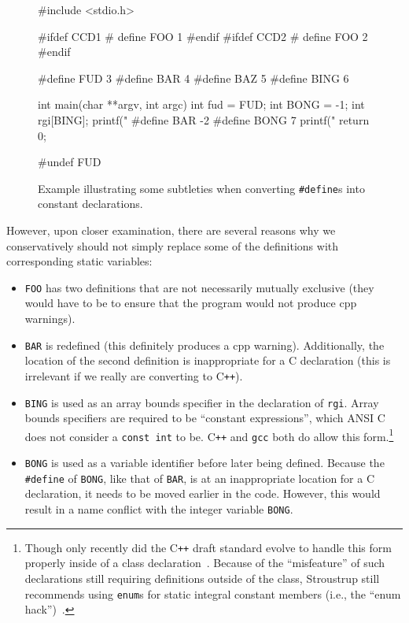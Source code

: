 \documentclass{article}
\newcommand{\Cpp}{\mbox{\textsf{cpp}}}
\newcommand{\CPP}{\mbox{C\texttt{++}}}
\newcommand{\C}{\mbox{C}}
\newcommand{\ppd}[1]{\texttt{\##1}}
\newcommand{\ie}{i.e.,}
\begin{document}
\begin{figure}[htbp]
\begin{center}
\begin{small}
\begin{pseudocode}[4.5in]
#include <stdio.h>

#ifdef CCD1
#  define FOO 1
#endif
#ifdef CCD2
#  define FOO 2
#endif

#define FUD 3
#define BAR 4
#define BAZ 5
#define BING 6

int main(char **argv, int argc) {
  int fud = FUD;
  int BONG = -1;
  int rgi[BING];
  printf("%
#define BAR -2
#define BONG 7
  printf("%
  return 0;
}

#undef FUD
\end{pseudocode}
\end{small}
\caption{Example illustrating some subtleties when converting \ppd{define}s
  into constant declarations.}
\label{fig:def_example}
\end{center}
\end{figure}

However, upon closer examination, there are several reasons why we
conservatively should not simply replace some of the definitions with
corresponding static variables:

\begin{itemize}
\item \texttt{FOO} has two definitions that are not necessarily mutually
      exclusive (they would have to be to ensure that the program would
      not produce \Cpp{} warnings).
\item \texttt{BAR} is redefined (this definitely produces a \Cpp{}
      warning).  Additionally, the location of the second definition is
      inappropriate for a \C{} declaration (this is irrelevant if we
      really are converting to \CPP{}).
\item \texttt{BING} is used as an array bounds specifier in the
      declaration of \texttt{rgi}.  Array bounds specifiers are required
      to be ``constant expressions'', which ANSI \C{} does not consider
      a \texttt{const int} to be.  \CPP{} and \texttt{gcc} both do allow
      this form.\footnote{Though only recently did the \CPP{} draft standard
      evolve to handle this form properly inside of a class
      declaration~\cite{CD2DraftStandard}.  Because of the
      ``misfeature'' of such declarations still requiring definitions
      outside of the class, Stroustrup still recommends using
      \texttt{enum}s for static integral constant members (\ie{} the
      ``enum hack'')~\cite[p.~249]{Stroustrup97}.}
\item \texttt{BONG} is used as a variable identifier before later being
      defined.  Because the \ppd{define} of \texttt{BONG}, like that
      of \texttt{BAR}, is at an inappropriate location for a \C{}
      declaration, it needs to be moved earlier in the code. However, this
      would result in a name conflict with the integer variable
      \texttt{BONG}.
\end{itemize}
\end{document}
